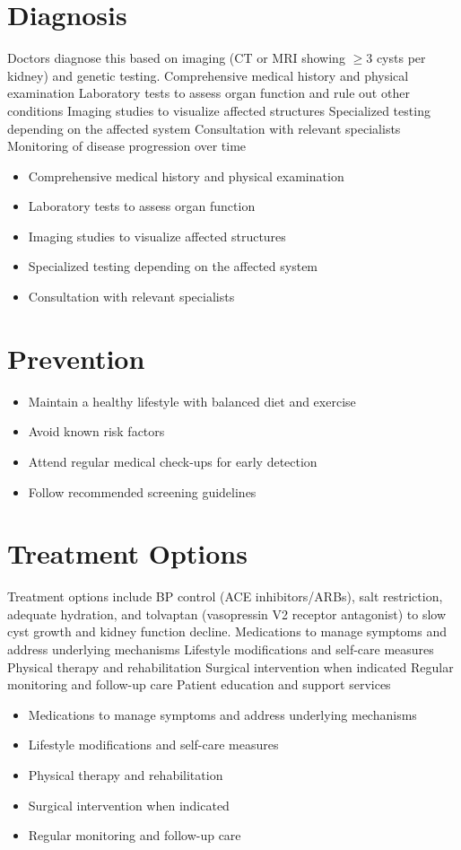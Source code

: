 \section{Diagnosis}
Doctors diagnose this based on imaging (CT or MRI showing $\geq$3 cysts per kidney) and genetic testing. Comprehensive medical history and physical examination Laboratory tests to assess organ function and rule out other conditions Imaging studies to visualize affected structures Specialized testing depending on the affected system Consultation with relevant specialists Monitoring of disease progression over time

\begin{itemize}[noitemsep]
  \item Comprehensive medical history and physical examination
  \item Laboratory tests to assess organ function
  \item Imaging studies to visualize affected structures
  \item Specialized testing depending on the affected system
  \item Consultation with relevant specialists
\end{itemize}
\section{Prevention}
\begin{itemize}[noitemsep]
  \item Maintain a healthy lifestyle with balanced diet and exercise
  \item Avoid known risk factors
  \item Attend regular medical check-ups for early detection
  \item Follow recommended screening guidelines
\end{itemize}
\section{Treatment Options}
Treatment options include BP control (ACE inhibitors/ARBs), salt restriction, adequate hydration, and tolvaptan (vasopressin V2 receptor antagonist) to slow cyst growth and kidney function decline. Medications to manage symptoms and address underlying mechanisms Lifestyle modifications and self-care measures Physical therapy and rehabilitation Surgical intervention when indicated Regular monitoring and follow-up care Patient education and support services

\begin{itemize}[noitemsep]
  \item Medications to manage symptoms and address underlying mechanisms
  \item Lifestyle modifications and self-care measures
  \item Physical therapy and rehabilitation
  \item Surgical intervention when indicated
  \item Regular monitoring and follow-up care
\end{itemize}

